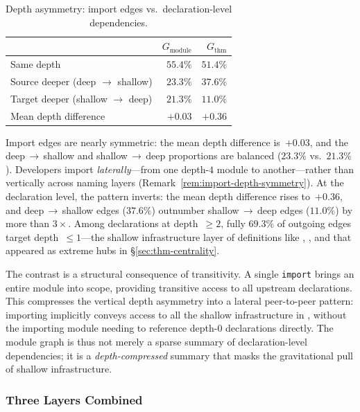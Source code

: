 \begin{table}[ht]
\centering
\caption{Depth asymmetry: import edges vs.\ declaration-level dependencies.}
\label{tab:depth-asymmetry}
\begin{tabular}{lrr}
\toprule
& $G_{\mathrm{module}}$ & $G_{\mathrm{thm}}$ \\
\midrule
Same depth                         & $55.4\%$ & $51.4\%$ \\
Source deeper (deep $\to$ shallow) & $23.3\%$ & $37.6\%$ \\
Target deeper (shallow $\to$ deep) & $21.3\%$ & $11.0\%$ \\
Mean depth difference              & $+0.03$  & $+0.36$  \\
\bottomrule
\end{tabular}
\end{table}

Import edges are nearly symmetric: the mean depth difference is~$+0.03$, and the deep$\,\to\,$shallow and shallow$\,\to\,$deep proportions are balanced ($23.3\%$ vs.\ $21.3\%$). Developers import \emph{laterally}---from one depth-$4$ module to another---rather than vertically across naming layers (Remark~\ref{rem:import-depth-symmetry}). At the declaration level, the pattern inverts: the mean depth difference rises to~$+0.36$, and deep$\,\to\,$shallow edges ($37.6\%$) outnumber shallow$\,\to\,$deep edges ($11.0\%$) by more than $3{\times}$. Among declarations at depth~$\ge 2$, fully $69.3\%$ of outgoing edges target depth~$\le 1$---the shallow infrastructure layer of definitions like , , and  that appeared as extreme hubs in \S\ref{sec:thm-centrality}.

The contrast is a structural consequence of transitivity. A single \texttt{import} brings an entire module into scope, providing transitive access to all upstream declarations. This compresses the vertical depth asymmetry into a lateral peer-to-peer pattern: importing  implicitly conveys access to all the shallow infrastructure in , without the importing module needing to reference depth-$0$ declarations directly. The module graph is thus not merely a sparse summary of declaration-level dependencies; it is a \emph{depth-compressed} summary that masks the gravitational pull of shallow infrastructure.

\subsubsection{Three Layers Combined}
\label{sec:three-layers}

